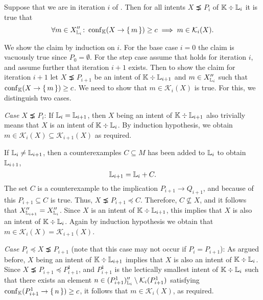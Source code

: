 \begin{Proposition}
  \label{prop:exploration-by-confidence-crucial-condition-holds}
  Suppose that we are in iteration $i$ of
  .  Then for all intents $X
  \precneq P_{i}$ of ${\mathbb{K}} \div {\ensuremath{\mathbb{L}}}_{i}$ it is true that
  \begin{equation}
    \label{eq:42}
    \forall m \in X_{{\mathbb{L}}_{i}}'' \colon \operatorname{conf}_{{\mathbb{K}}}(X \to {\ensuremath{\{\,m\,\}}}) \ge c \implies m
    \in \mathcal{K}_{i}(X).
\end{equation}
\end{Proposition}
\begin{Proof}
  We show the claim by induction on $i$.  For the base case $i = 0$ the claim is vacuously
  true since $P_{0} = \emptyset$.  For the step case assume that  holds for
  iteration $i$, and assume further that iteration $i+1$ exists.  Then to show the claim
  for iteration $i+1$ let $X \precneq P_{i+1}$ be an intent of ${\mathbb{K}} \div {\ensuremath{\mathbb{L}}}_{i+1}$
  and $m \in X_{{\mathbb{L}}_{i}}''$ such that $\operatorname{conf}_{{\mathbb{K}}}(X \to {\ensuremath{\{\,m\,\}}}) \ge c$. We need to
  show that $m \in \mathcal{K}_{i}(X)$ is true.  For this, we distinguish two cases.

  \textit{Case $X \precneq P_{i}$}: If ${\mathbb{L}}_{i} = {\mathbb{L}}_{i+1}$, then $X$ being an
  intent of ${\mathbb{K}} \div {\ensuremath{\mathbb{L}}}_{i+1}$ also trivially means that $X$ is an intent of ${\mathbb{K}} \div {\ensuremath{\mathbb{L}}}_{i}$.  By induction hypothesis, we obtain $m \in \mathcal{K}_{i}(X)
  \subseteq \mathcal{K}_{i+1}(X)$ as required.

  If ${\mathbb{L}}_{i} \neq {\ensuremath{\mathbb{L}}}_{i+1}$, then a counterexamples $C \subseteq M$ has been added
  to ${\mathbb{L}}_{i}$ to obtain ${\mathbb{L}}_{i+1}$, \ie
  \begin{equation*}
    {\ensuremath{\mathbb{L}}}_{i+1} = {\mathbb{L}}_{i} + C.
  \end{equation*}
  The set $C$ is a counterexample to the implication $P_{i+1} \to Q_{i+1}$, and because of
  this $P_{i+1} \subseteq C$ is true.  Thus, $X \precneq P_{i+1} \preceq C$.  Therefore,
  $C \not\subseteq X$, and it follows that $X_{{\mathbb{L}}_{i+1}}'' = X_{{\mathbb{L}}_{i}}''$.  Since
  $X$ is an intent of ${\mathbb{K}} \div {\ensuremath{\mathbb{L}}}_{i+1}$, this implies that $X$ is also an intent
  of ${\mathbb{K}} \div {\ensuremath{\mathbb{L}}}_{i}$.  Again by induction hypothesis we obtain that $m \in
  \mathcal{K}_{i}(X) = \mathcal{K}_{i+1}(X)$.

  \textit{Case $P_{i} \preceq X \precneq P_{i+1}$} (note that this case may not occur if
  $P_{i} = P_{i+1}$): As argued before, $X$ being an intent of ${\mathbb{K}} \div {\ensuremath{\mathbb{L}}}_{i+1}$
  implies that $X$ is also an intent of ${\mathbb{K}} \div {\ensuremath{\mathbb{L}}}_{i}$.  Since $X \precneq
  P_{i+1} \preceq P_{i+1}^{1}$, and $P_{i+1}^{1}$ is the lectically smallest intent of
  ${\mathbb{K}} \div {\ensuremath{\mathbb{L}}}_{i}$ such that there exists an element $n \in (P_{i+1}^{1})_{{\mathbb{L}}_{i}}'' \setminus \mathcal{K}_{i}(P_{i+1}^{1})$ satisfying $\operatorname{conf}_{{\mathbb{K}}}(P_{i+1}^{1} \to {\ensuremath{\{\,n\,\}}}) \ge c$, it follows that $m \in \mathcal{K}_{i}(X)$, as
  required.
\end{Proof}

